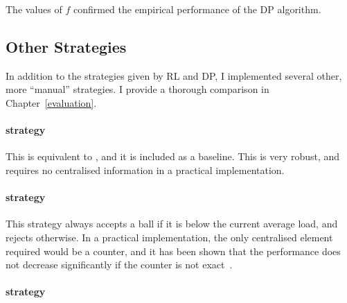 The values of $f$ confirmed the empirical performance of the DP algorithm.

\subsection{Other Strategies}

In addition to the strategies given by RL and DP, I implemented several other, more ``manual'' strategies. I provide a thorough comparison in Chapter~\ref{evaluation}.


\paragraph{\AlwaysAccept strategy}
This is equivalent to \OneChoice, and it is included as a baseline. This is very robust, and requires no centralised information in a practical implementation.


\paragraph{\MeanThinning strategy}
This strategy always accepts a ball if it is below the current average load, and rejects otherwise. In a practical implementation, the only centralised element required would be a counter, and it has been shown that the performance does not decrease significantly if the counter is not exact~\cite{los2022cachingpackingthinningtwinning}. 


\paragraph{\LocalRewardOptimiser strategy}

